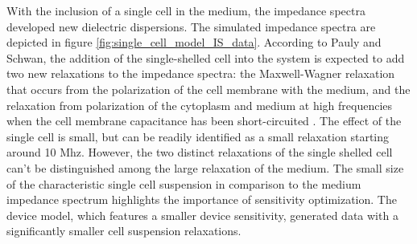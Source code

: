 \par With the inclusion of a single cell in the medium, the impedance spectra developed new dielectric dispersions. The simulated impedance spectra are depicted in figure \ref{fig:single_cell_model_IS_data}. According to Pauly and Schwan, the addition of the single-shelled cell into the system is expected to add two new relaxations to the impedance spectra: the Maxwell-Wagner relaxation that occurs from the polarization of the cell membrane with the medium, and the relaxation from polarization of the cytoplasm and medium at high frequencies when the cell membrane capacitance has been short-circuited \cite{pauly_uber_1959,sun_single-cell_2010}. The effect of the single cell is small, but can be readily identified as a small relaxation starting around 10 Mhz. However, the two distinct relaxations of the single shelled cell can't be distinguished among the large relaxation of the medium. The small size of the characteristic single cell suspension in comparison to the medium impedance spectrum highlights the importance of sensitivity optimization. The device model, which features a smaller device sensitivity, generated data with a significantly smaller cell suspension relaxations. 

